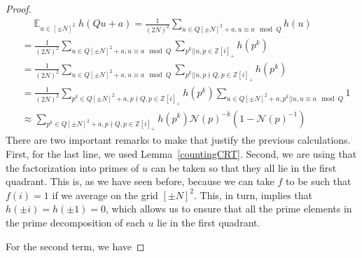 \documentclass[11pt]{amsart}
\theoremstyle{definition}
\DeclareMathOperator*{\E}{\mathbb{E}}
\newcommand{\NN}{{\mathcal N}}
\newcommand{\Z}{{\mathbb Z}}
\begin{document}
\begin{proof}
{\begin{equation}
    \begin{split}
        &\quad \E_{u\in [\pm N]^2}h(Qu+a)
        =\frac{1}{(2N)^2}\sum_{u\in Q[\pm N]^2+a, u\equiv a \mod Q}h(u)
        \\&=\frac{1}{(2N)^2}\sum_{u\in Q[\pm N]^2+a, u\equiv a \mod Q}\sum_{p^{k}|| u, p \in \Z[i]_+} h(p^{k})
        \\&=\frac{1}{(2N)^2}\sum_{u\in Q[\pm N]^2+a, u\equiv a \mod Q}\sum_{p^{k}|| u, p\nmid Q, p \in \Z[i]_+} h(p^{k})
        \\&=\frac{1}{(2N)^2}\sum_{p^{k}\in Q[\pm N]^2+a, p\nmid Q, p \in \Z[i]_+}h(p^{k})\sum_{u\in Q[\pm N]^2+a, p^{k}||u, u\equiv a \mod Q} 1
    \\&\approx \sum_{p^{k}\in Q[\pm N]^2+a, p\nmid Q, p \in \Z[i]_+}h(p^{k})\NN(p)^{-k}(1-\NN(p)^{-1})
    \end{split}
\end{equation}
There are two important remarks to make that justify the previous calculations. First, for the last line, we used Lemma~\ref{countingCRT}. Second, we are using that the factorization into primes of $u$ can be taken so that they all lie in the first quadrant. This is, as we have seen before, because we can take $f$ to be such that $f(i)=1$ if we average on the grid $[\pm N]^2$. This, in turn, implies that $h(\pm i)=h(\pm 1)=0$, which allows us to ensure that all the prime elements in the prime decomposition of each $u$ lie in the first quadrant. 

For the second term, we have

}
\end{proof}
\end{document}
